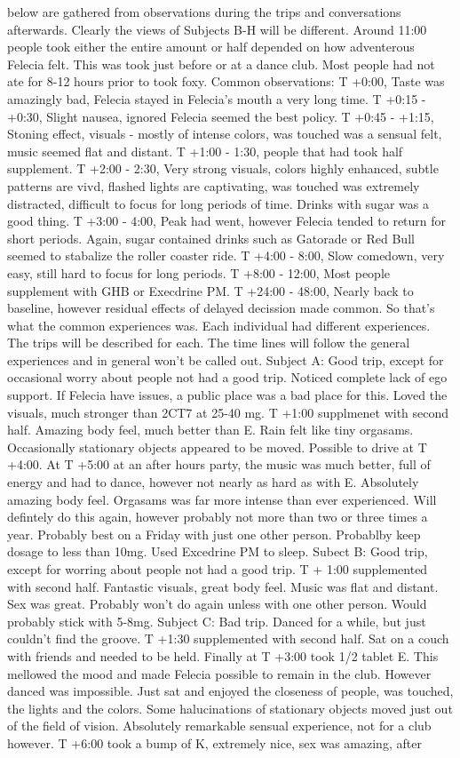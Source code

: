 \documentclass[12pt]{book}
\begin{document}
below are gathered from observations during the trips and conversations afterwards. Clearly the views of Subjects B-H will be different. Around 11:00 people took either the entire amount or half depended on how adventerous Felecia felt. This was took just before or at a dance club. Most people had not ate for 8-12 hours prior to took foxy. Common observations: T +0:00, Taste was amazingly bad, Felecia stayed in Felecia's mouth a very long time. T +0:15 - +0:30, Slight nausea, ignored Felecia seemed the best policy. T +0:45 - +1:15, Stoning effect, visuals - mostly of intense colors, was touched was a sensual felt, music seemed flat and distant. T +1:00 - 1:30, people that had took half supplement. T +2:00 - 2:30, Very strong visuals, colors highly enhanced, subtle patterns are vivd, flashed lights are captivating, was touched was extremely distracted, difficult to focus for long periods of time. Drinks with sugar was a good thing. T +3:00 - 4:00, Peak had went, however Felecia tended to return for short periods. Again, sugar contained drinks such as Gatorade or Red Bull seemed to stabalize the roller coaster ride. T +4:00 - 8:00, Slow comedown, very easy, still hard to focus for long periods. T +8:00 - 12:00, Most people supplement with GHB or Execdrine PM. T +24:00 - 48:00, Nearly back to baseline, however residual effects of delayed decission made common. So that's what the common experiences was. Each individual had different experiences. The trips will be described for each. The time lines will follow the general experiences and in general won't be called out. Subject A: Good trip, except for occasional worry about people not had a good trip. Noticed complete lack of ego support. If Felecia have issues, a public place was a bad place for this. Loved the visuals, much stronger than 2CT7 at 25-40 mg. T +1:00 supplmenet with second half. Amazing body feel, much better than E. Rain felt like tiny orgasams. Occasionally stationary objects appeared to be moved. Possible to drive at T +4:00. At T +5:00 at an after hours party, the music was much better, full of energy and had to dance, however not nearly as hard as with E. Absolutely amazing body feel. Orgasams was far more intense than ever experienced. Will defintely do this again, however probably not more than two or three times a year. Probably best on a Friday with just one other person. Probablby keep dosage to less than 10mg. Used Excedrine PM to sleep. Subect B: Good trip, except for worring about people not had a good trip. T + 1:00 supplemented with second half. Fantastic visuals, great body feel. Music was flat and distant. Sex was great. Probably won't do again unless with one other person. Would probably stick with 5-8mg. Subject C: Bad trip. Danced for a while, but just couldn't find the groove. T +1:30 supplemented with second half. Sat on a couch with friends and needed to be held. Finally at T +3:00 took 1/2 tablet E. This mellowed the mood and made Felecia possible to remain in the club. However danced was impossible. Just sat and enjoyed the closeness of people, was touched, the lights and the colors. Some halucinations of stationary objects moved just out of the field of vision. Absolutely remarkable sensual experience, not for a club however. T +6:00 took a bump of K, extremely nice, sex was amazing, after 
\end{document}
